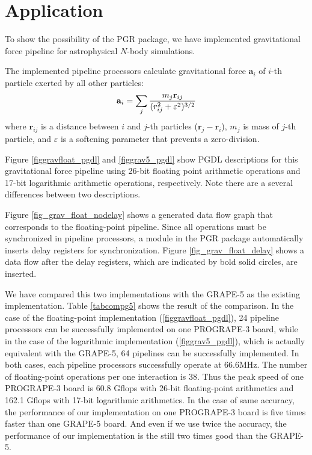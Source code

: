 \documentclass[times, 10pt,twocolumn]{article}
\begin{document}
\section{Application}
To show the possibility of the PGR package, we have implemented gravitational
force pipeline for astrophysical $N$-body simulations.

The implemented pipeline processors calculate gravitational force 
$\mathbf{a}_i$ of $i$-th particle exerted by all other particles:
\begin{equation}
\mathbf{ a}_i = \sum_j {m_j \mathbf{ r}_{ij} \over (r_{ij}^2 + \varepsilon^2)^{3/2}}
\end{equation}
where $\mathbf{r}_{ij}$ is a distance between $i$ and $j$-th particles
($\mathbf{r}_j - \mathbf{r}_i $), 
$m_{j}$ is mass of $j$-th particle, and $\varepsilon$ is a softening parameter
that prevents a zero-division.

Figure \ref{figgravfloat_pgdl} and \ref{figgrav5_pgdl}
show PGDL descriptions for this gravitational force pipeline
using 26-bit floating point arithmetic operations and
17-bit logarithmic arithmetic operations, respectively.
Note there are a several differences between two descriptions.

Figure \ref{fig_grav_float_nodelay} shows a generated 
data flow graph that corresponds to the floating-point pipeline.
Since all operations must be synchronized in pipeline processors, 
a module in the PGR package automatically inserts
delay registers for synchronization.
Figure \ref{fig_grav_float_delay} shows a data flow
after the delay registers, which are indicated by bold solid circles, are inserted.

We have compared this two implementations with the GRAPE-5 as the
existing implementation.  Table \ref{tabcompg5} shows the result of
the comparison.  In the case of the floating-point implementation
(\ref{figgravfloat_pgdl}), 24 pipeline processors can be successfully
implemented on one PROGRAPE-3 board, while in the case of the
logarithmic implementation (\ref{figgrav5_pgdl}), which is actually
equivalent with the GRAPE-5, 64 pipelines can be successfully
implemented.  In both cases, each pipeline processors successfully
operate at 66.6MHz.  The number of floating-point operations per one
interaction is 38.  Thus the peak speed of one PROGRAPE-3 board is
60.8 Gflops with 26-bit floating-point arithmetics and 162.1 Gflops
with 17-bit logarithmic arithmetics.
In the case of same accuracy, the performance of our implementation on one PROGRAPE-3
board is five times faster than one GRAPE-5 board.  And even if we use
twice the accuracy, the performance of our implementation is the still
two times good than the GRAPE-5.
\end{document}
